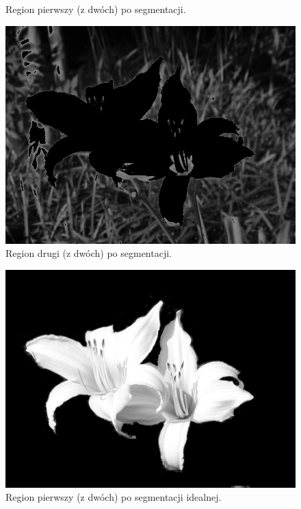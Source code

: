 \documentclass[10pt]{llncs}
\begin{document}
\begin{figure}[!htb]
  \caption{Region pierwszy (z dwóch) po segmentacji.}\label{fig:2}
\endminipage\hfill
{}
  \includegraphics[width=\linewidth]{img/01_region_02.jpg}
  \caption{Region drugi (z dwóch) po segmentacji.}\label{fig:3}
\endminipage
\end{figure}

\begin{figure}[!htb]
  \includegraphics[width=\linewidth]{img/01_correct_segmentation.jpg}
  \caption{Region pierwszy (z dwóch) po segmentacji idealnej.}\label{fig:3_prim}
\endminipage\hfill
\end{figure}

\FloatBarrier
\end{document}

